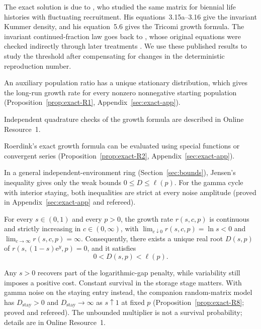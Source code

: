 The exact solution is due to \citet{roerdink1988}, who studied the same matrix for biennial life histories with fluctuating recruitment. His equations~3.15a--3.16 give the invariant Kummer density, and his equation~5.6 gives the Tricomi growth formula. The invariant continued-fraction law goes back to \citet{dyson1953}, whose original equations were checked indirectly through later treatments \citep{roerdink1988,marklof2008,letac2010,forrester2021a,forrester2021b}. We use these published results to study the threshold after compensating for changes in the deterministic reproduction number.

An auxiliary population ratio has a unique stationary distribution, which gives the long-run growth rate for every nonzero nonnegative starting population (Proposition~\ref{prop:exact-R1}, Appendix~\ref{sec:exact-app}).

Independent quadrature checks of the growth formula are described in Online Resource~1.

Roerdink's exact growth formula can be evaluated using special functions or convergent series (Proposition~\ref{prop:exact-R2}, Appendix~\ref{sec:exact-app}).

In a general independent-environment ring (Section~\ref{sec:bounds}), Jensen's inequality gives only the weak bounds $0 \le D \le \ell(p)$. For the gamma cycle with interior staying, both inequalities are strict at every noise amplitude (proved in Appendix~\ref{sec:exact-app} and refereed).

\begin{proposition}\label{prop:exact-R3}
For every $s \in (0,1)$ and every $p > 0$, the growth rate $r(s,c,p)$ is continuous and strictly increasing in $c \in (0,\infty)$, with $\lim_{c\downarrow 0} r(s,c,p) = \ln s < 0$ and $\lim_{c\to\infty} r(s,c,p) = \infty$. Consequently, there exists a unique real root $D(s,p)$ of $r(s, (1-s)\mathrm{e}^y, p) = 0$, and it satisfies
\begin{equation}
0 < D(s,p) < \ell(p).
\label{eq:exact-bounds}
\end{equation}
\end{proposition}

Any $s>0$ recovers part of the logarithmic-gap penalty, while variability still imposes a positive cost. Constant survival in the storage stage matters. With gamma noise on the staying entry instead, the companion random-matrix model has $D_{\mathrm{stay}}>0$ and $D_{\mathrm{stay}}\to\infty$ as $s\uparrow1$ at fixed $p$ (Proposition~\ref{prop:exact-R8}; proved and refereed). The unbounded multiplier is not a survival probability; details are in Online Resource~1.

